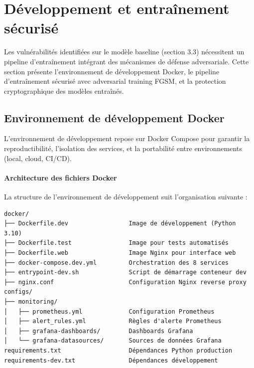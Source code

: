 %        

\section{Développement et entraînement sécurisé}

Les vulnérabilités identifiées sur le modèle baseline (section 3.3) nécessitent un pipeline d'entraînement intégrant des mécanismes de défense adversariale. Cette section présente l'environnement de développement Docker, le pipeline d'entraînement sécurisé avec adversarial training FGSM, et la protection cryptographique des modèles entraînés.

\subsection{Environnement de développement Docker}

L'environnement de développement repose sur Docker Compose pour garantir la reproductibilité, l'isolation des services, et la portabilité entre environnements (local, cloud, CI/CD).

\paragraph{Architecture des fichiers Docker}

La structure de l'environnement de développement suit l'organisation suivante :

\begin{verbatim}
docker/
├── Dockerfile.dev                 Image de développement (Python 3.10)
├── Dockerfile.test                Image pour tests automatisés
├── Dockerfile.web                 Image Nginx pour interface web
├── docker-compose.dev.yml         Orchestration des 8 services
├── entrypoint-dev.sh              Script de démarrage conteneur dev
├── nginx.conf                     Configuration Nginx reverse proxy
configs/
├── monitoring/
│   ├── prometheus.yml             Configuration Prometheus
│   ├── alert_rules.yml            Règles d'alerte Prometheus
│   ├── grafana-dashboards/        Dashboards Grafana
│   └── grafana-datasources/       Sources de données Grafana
requirements.txt                   Dépendances Python production
requirements-dev.txt               Dépendances développement
\end{verbatim}

